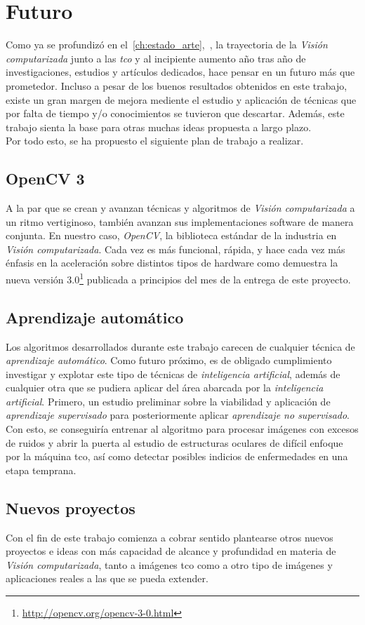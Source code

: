\chapter{Futuro}
Como ya se profundizó en
el~\autoref{ch:estado_arte},~, la trayectoria
de la \emph{Visión computarizada} junto a las \emph{\gls{tco}} y al
incipiente aumento año tras año de investigaciones, estudios y
artículos dedicados, hace pensar en un futuro más que
prometedor. Incluso a pesar de los buenos resultados obtenidos en este
trabajo, existe un gran margen de mejora mediente el estudio y
aplicación de técnicas que por falta de tiempo y/o conocimientos se
tuvieron que descartar. Además, este trabajo sienta la base para otras
muchas ideas propuesta a largo plazo.\\
Por todo esto, se ha propuesto el siguiente plan de trabajo a
realizar.

\section{OpenCV 3}
A la par que se crean y avanzan técnicas y algoritmos de \emph{Visión
  computarizada} a un ritmo vertiginoso, también avanzan sus
implementaciones software de manera conjunta. En nuestro caso,
\emph{OpenCV}, la biblioteca estándar de la industria en \emph{Visión
  computarizada}. Cada vez es más funcional, rápida, y hace cada vez
más énfasis en la aceleración sobre distintos tipos de hardware
como demuestra la nueva versión
$3.0$\footnote{\url{http://opencv.org/opencv-3-0.html}} publicada a
principios del mes de la entrega de este proyecto.

\section{Aprendizaje automático}
Los algoritmos desarrollados durante este trabajo carecen de cualquier
técnica de \emph{aprendizaje automático}. Como futuro próximo, es de
obligado cumplimiento investigar y explotar este tipo de técnicas de
\emph{inteligencia artificial}, además de cualquier otra que se pudiera
aplicar del área abarcada por la \emph{inteligencia
  artificial}. Primero, un estudio preliminar sobre la viabilidad y
aplicación de \emph{aprendizaje supervisado} para posteriormente
aplicar \emph{aprendizaje no supervisado}. Con esto, se conseguiría
entrenar al algoritmo para procesar imágenes con excesos de ruidos y
abrir la puerta al estudio de estructuras oculares de difícil enfoque
por la máquina \gls{tco}, así como detectar posibles indicios de 
enfermedades en una etapa temprana.

\section{Nuevos proyectos}
Con el fin de este trabajo comienza a cobrar sentido plantearse otros
nuevos proyectos e ideas con más capacidad de alcance y profundidad en
materia de \emph{Visión computarizada}, tanto a imágenes \gls{tco} como
a otro tipo de imágenes y aplicaciones reales a las que se pueda extender.
